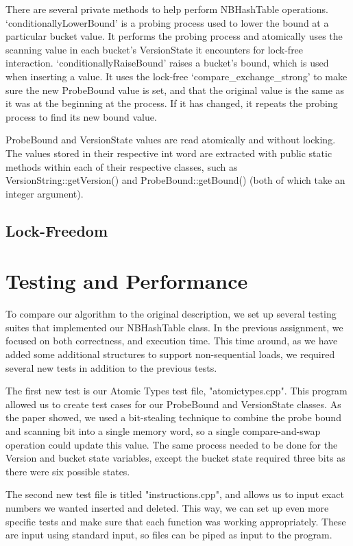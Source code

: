 \documentclass[journal]{IEEEtran}
\begin{document}
There are several private methods to help perform NBHashTable operations. ‘conditionallyLowerBound’ is a probing process used to lower the bound at a particular bucket value. It performs the probing process and atomically uses the scanning value in each bucket’s VersionState it encounters for lock-free interaction. ‘conditionallyRaiseBound’ raises a bucket’s bound, which is used when inserting a value. It uses the lock-free ‘compare\_exchange\_strong’ to make sure the new ProbeBound value is set, and that the original value is the same as it was at the beginning at the process. If it has changed, it repeats the probing process to find its new bound value.

ProbeBound and VersionState values are read atomically and without locking. The values stored in their respective int word are extracted with public static methods within each of their respective classes, such as VersionString::getVersion() and ProbeBound::getBound() (both of which take an integer argument).

\subsection{Lock-Freedom}


\section{Testing and Performance}

To compare our algorithm to the original description, we set up several testing suites that implemented our NBHashTable class. In the previous assignment, we focused on both correctness, and execution time. This time around, as we have added some additional structures to support non-sequential loads, we required several new tests in addition to the previous tests.

The first new test is our Atomic Types test file, "atomictypes.cpp". This program allowed us to create test cases for our ProbeBound and VersionState classes. As the paper showed, we used a bit-stealing technique to combine the probe bound and scanning bit into a single memory word, so a single compare-and-swap operation could update this value. The same process needed to be done for the Version and bucket state variables, except the bucket state required three bits as there were six possible states.

The second new test file is titled "instructions.cpp", and allows us to input exact numbers we wanted inserted and deleted. This way, we can set up even more specific tests and make sure that each function was working appropriately. These are input using standard input, so files can be piped as input to the program.
\end{document}
